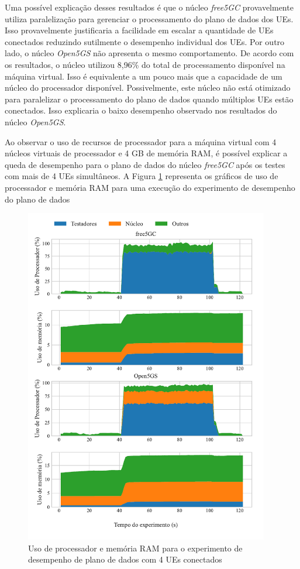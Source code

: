 Uma possível explicação desses resultados é que o núcleo \textit{free5GC} provavelmente utiliza paralelização para gerenciar o processamento do plano de dados dos UEs.
Isso provavelmente justificaria a facilidade em escalar a quantidade de UEs conectados reduzindo sutilmente o desempenho individual dos UEs.
Por outro lado, o núcleo \textit{Open5GS} não apresenta o mesmo comportamento.
De acordo com os resultados, o núcleo utilizou 8,96\% do total de processamento disponível na máquina virtual.
Isso é equivalente a um pouco mais que a capacidade de um núcleo do processador disponível.
Possivelmente, este núcleo não está otimizado para paralelizar o processamento do plano de dados quando múltiplos UEs estão conectados.
Isso explicaria o baixo desempenho observado nos resultados do núcleo \textit{Open5GS}.

Ao observar o uso de recursos de processador para a máquina virtual com 4 núcleos virtuais de processador e 4 GB de memória RAM, é possível explicar a queda de desempenho para o plano de dados do núcleo \textit{free5GC} após os testes com mais de 4 UEs simultâneos.
A Figura \ref{fig:exp2_4gnb_4c} representa os gráficos de uso de processador e memória RAM para uma execução do experimento de desempenho do plano de dados 

\begin{figure}[H]
    \centering
    \includegraphics[width=0.95\textwidth]{TG2/Chapters/DataAnalysis/Figures/EXP2-IPERF-RES-4gNB-4C-4GB.pdf}
    \caption{Uso de processador e memória RAM para o experimento de desempenho de plano de dados com 4 UEs conectados}
    \label{fig:exp2_4gnb_4c}
\end{figure}

